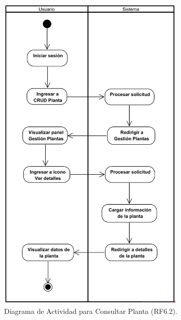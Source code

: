 \begin{figure}[H]
	\centering
	\caption{Diagrama de Actividad para Consultar Planta (RF6.2).}
 \includegraphics[width=0.8\textwidth]{UML/Actividad/Diagrama de Actividad RF6.2 Consultar Planta.png}
\end{figure}


